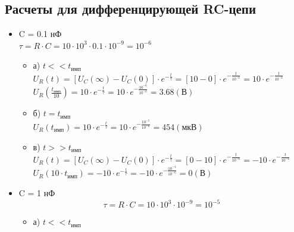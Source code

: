 \subsection{Расчеты для дифференцирующей RC-цепи}
\begin{itemize}
\item C = 0.1 нФ\\

		$\tau = R \cdot C = 10 \cdot 10^3 \cdot 0.1 \cdot 10^{-9} = 10^{-6}$\\

\begin{itemize}
\item[] а) $t << t_\text{имп}$\\

		$U_R(t) = [U_C(\infty) - U_C(0)] \cdot e^{-\frac{t}{\tau}} = [10 - 0] \cdot e^{-\frac{t}{10^{-6}}} = 10 \cdot e^{-\frac{t}{10^{-6}}}$\\


		$U_R(\frac{t_\text{имп}}{10}) = 10 \cdot e^{-\frac{t}{\tau}} = 10 \cdot e^{-\frac{10^{-6}}{10^{-6}}} = 3.68 (\text{В})$\\

\item[] б) $t = t_\text{имп}$\\
		$U_R(t_\text{имп}) = 10 \cdot e^{-\frac{t}{\tau}} = 10 \cdot e^{-\frac{10^{-5}}{10^{-6}}} = 454 (\text{мкВ})$\\
	
\item[] в) $t >> t_\text{имп}$\\
		$U_R(t) = [U_C(\infty) - U_C(0)] \cdot e^{-\frac{t}{\tau}} = [0 - 10] \cdot e^{-\frac{t}{10^{-6}}} = -10 \cdot e^{-\frac{t}{10^{-6}}}$\\

		$U_R(10 \cdot t_\text{имп}) = -10 \cdot e^{-\frac{t}{\tau}} = -10 \cdot e^{-\frac{10^{-4}}{10^{-6}}} = 0 (\text{В})$\\

\end{itemize}

\item C = 1 нФ\\
\begin{equation}
		\tau = R \cdot C = 10 \cdot 10^3 \cdot 10^{-9} = 10^{-5}
	\end{equation}
\begin{itemize}
\item[] а) $t << t_\text{имп}$\\


\end{itemize}
\end{itemize}
